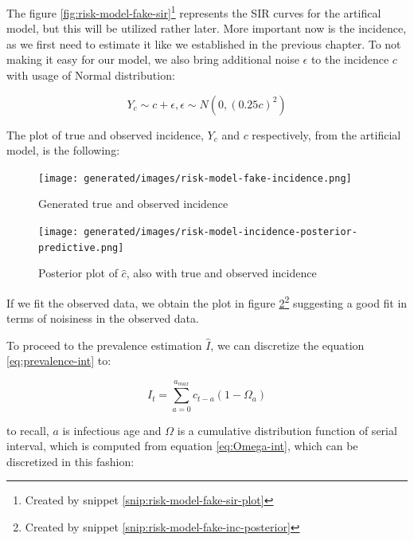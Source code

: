 \documentclass[
  digital, %
  oneside, %
  lof,     %
  lot,     %
]{fithesis4}
\begin{document}
The figure \ref{fig:risk-model-fake-sir}\footnote{Created by snippet \ref{snip:risk-model-fake-sir-plot}} represents the SIR 
curves for the artifical model, but this will be utilized rather later.
More important now is the incidence, as we first need to estimate 
it like we established in the previous chapter.
To not making it easy for our model, we also bring additional
noise $\epsilon$ to the incidence $c$ with usage of Normal distribution:

\begin{equation}
  Y_{c} \sim c + \epsilon, \epsilon \sim N \left( 0, \left( 0.25 c \right )^2 \right)
\end{equation}

The plot of true and observed incidence, $Y_{c}$ and 
$c$ respectively, from the artificial model, is the following:

\begin{figure}[H]
  \begin{center}
    \texttt{[image: generated/images/risk-model-fake-incidence.png]}
  \end{center}
  \caption{Generated true and observed incidence}
  \label{fig:risk-model-fake-incidence}
\end{figure}

\begin{figure}[H]
  \begin{center}
    \texttt{[image: generated/images/risk-model-incidence-posterior-predictive.png]}
  \end{center}
  \caption{Posterior plot of $\hat{c}$, also with true and observed incidence}
  \label{fig:risk-model-incidence-posterior-predictive}
\end{figure}

If we fit the observed data, we obtain the 
plot in figure \ref{fig:risk-model-incidence-posterior-predictive}\footnote{Created by snippet \ref{snip:risk-model-fake-inc-posterior}}
suggesting a good fit in terms of noisiness in the observed data.

To proceed to the prevalence estimation $\hat{I}$, 
we can discretize the equation \ref{eq:prevalence-int} to:

\begin{equation}\label{eq:prevalence-sum}
  I_t = \sum_{a=0}^{a_{max}} c_{t - a} (1 - \Omega_a)
\end{equation}

to recall, $a$ is infectious age and $\Omega$ is
a cumulative distribution function of
serial interval, which is computed from
equation \ref{eq:Omega-int}, which 
can be discretized in this fashion:
\end{document}
